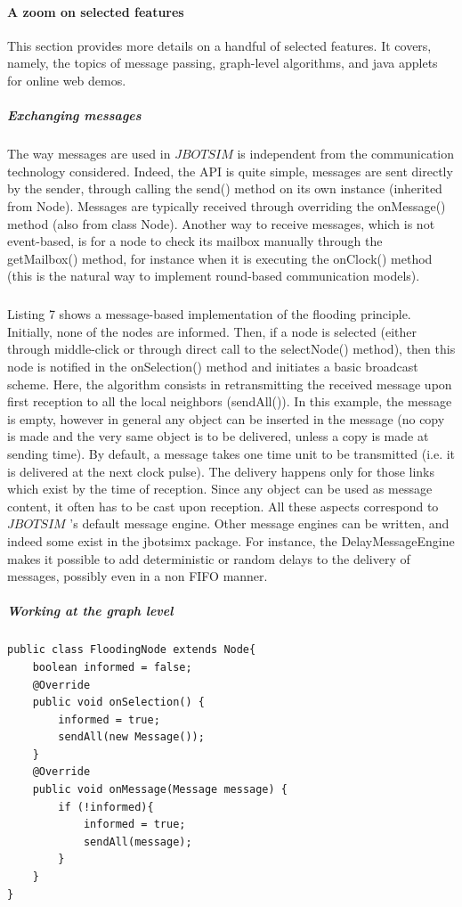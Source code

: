 \paragraph{A zoom on selected features}This section provides more details on a handful of selected features. It covers, namely, the topics of message passing, graph-level algorithms, and java applets for online web demos.
\subparagraph{Exchanging messages}The way messages are used in $JBOTSIM$ is independent from the communication technology considered. Indeed, the API is quite simple, messages are sent directly by the sender, through calling the send() method on its own instance (inherited from Node). Messages are typically received through overriding the onMessage() method (also from class Node). Another way to receive messages, which is not event-based, is for a node to check its mailbox manually through the getMailbox() method, for instance when it is executing the onClock() method (this is the natural way to implement round-based communication models). \subparagraph{}Listing 7 shows a message-based implementation of the flooding principle. Initially, none of the nodes are informed. Then, if a node is selected (either through middle-click or through direct call to the selectNode() method), then this node is notified in the onSelection() method and initiates a basic broadcast scheme. Here, the algorithm consists in retransmitting the received message upon first reception to all the local neighbors (sendAll()). In this example, the message is empty, however in general any object can be inserted in the message (no copy is made and the very same object is to be delivered, unless a copy is made at sending time). By default, a message takes one time unit to be transmitted (i.e. it is delivered at the next clock pulse). The delivery happens only for those links which exist by the time of reception. Since any object can be used as message content, it often has to be cast upon reception. All these aspects correspond to  $JBOTSIM$ ’s default message engine. Other message engines can be written, and indeed some exist in the jbotsimx package. For instance, the DelayMessageEngine makes it possible to add deterministic or random delays to the delivery of messages, possibly even in a non FIFO manner.
\newpage
\subparagraph{Working at the graph level}
\begin{lstlisting}[caption=Example of message passing algorithm, captionpos=b]
public class FloodingNode extends Node{
	boolean informed = false;
	@Override 
	public void onSelection() {
		informed = true;
		sendAll(new Message());
	}
	@Override
	public void onMessage(Message message) {
		if (!informed){
			informed = true;
			sendAll(message);
		}
	}
}
\end{lstlisting}
